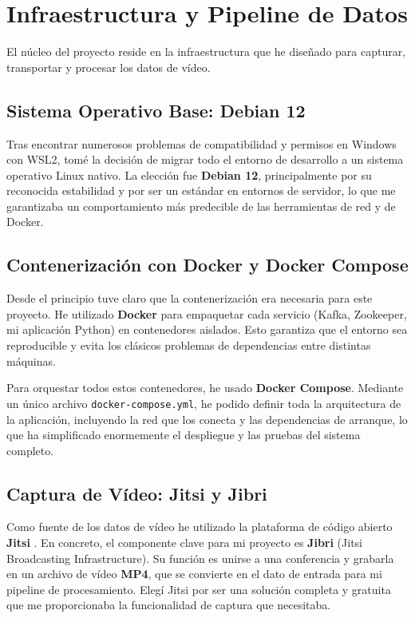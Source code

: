 \section{Infraestructura y Pipeline de Datos}
\label{sec:herramientas_infraestructura}
El núcleo del proyecto reside en la infraestructura que he diseñado para capturar, transportar y procesar los datos de vídeo.

\subsection{Sistema Operativo Base: Debian 12}
Tras encontrar numerosos problemas de compatibilidad y permisos en Windows con WSL2, tomé la decisión de migrar todo el entorno de desarrollo a un sistema operativo Linux nativo. La elección fue \textbf{Debian 12}, principalmente por su reconocida estabilidad y por ser un estándar en entornos de servidor, lo que me garantizaba un comportamiento más predecible de las herramientas de red y de Docker.

\subsection{Contenerización con Docker y Docker Compose}
Desde el principio tuve claro que la contenerización era necesaria para este proyecto. He utilizado \textbf{Docker} \cite{docker_docs} para empaquetar cada servicio (Kafka, Zookeeper, mi aplicación Python) en contenedores aislados. Esto garantiza que el entorno sea reproducible y evita los clásicos problemas de dependencias entre distintas máquinas.

Para orquestar todos estos contenedores, he usado \textbf{Docker Compose}. Mediante un único archivo \texttt{docker-compose.yml}, he podido definir toda la arquitectura de la aplicación, incluyendo la red que los conecta y las dependencias de arranque, lo que ha simplificado enormemente el despliegue y las pruebas del sistema completo.

\subsection{Captura de Vídeo: Jitsi y Jibri}
Como fuente de los datos de vídeo he utilizado la plataforma de código abierto \textbf{Jitsi} \cite{JitsiJibriDocs}. En concreto, el componente clave para mi proyecto es \textbf{Jibri} (Jitsi Broadcasting Infrastructure). Su función es unirse a una conferencia y grabarla en un archivo de vídeo \textbf{MP4}, que se convierte en el dato de entrada para mi pipeline de procesamiento. Elegí Jitsi por ser una solución completa y gratuita que me proporcionaba la funcionalidad de captura que necesitaba.

